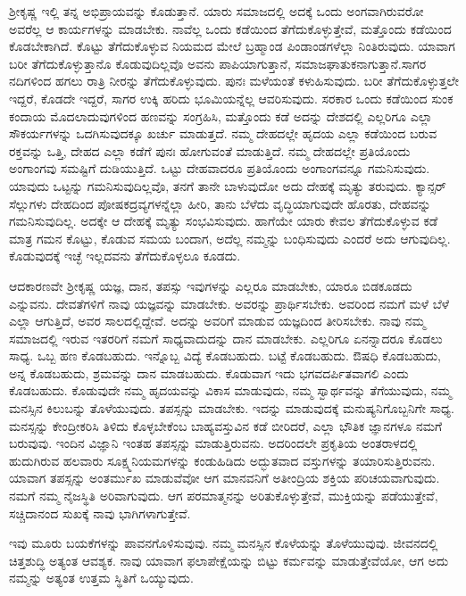 ಶ‍್ರೀಕೃಷ್ಣ ಇಲ್ಲಿ ತನ್ನ ಅಭಿಪ್ರಾಯವನ್ನು ಕೊಡುತ್ತಾನೆ. ಯಾರು ಸಮಾಜದಲ್ಲಿ ಅದಕ್ಕೆ ಒಂದು ಅಂಗವಾಗಿರುವರೋ ಅವರೆಲ್ಲ ಆ ಕಾರ್ಯಗಳನ್ನು ಮಾಡಬೇಕು. ನಾವೆಲ್ಲ ಒಂದು ಕಡೆಯಿಂದ ತೆಗೆದುಕೊಳ್ಳುತ್ತೇವೆ, ಮತ್ತೊಂದು ಕಡೆಯಿಂದ ಕೊಡಬೇಕಾಗಿದೆ. ಕೊಟ್ಟು ತೆಗೆದುಕೊಳ್ಳುವ ನಿಯಮದ ಮೇಲೆ ಬ್ರಹ್ಮಾಂಡ ಪಿಂಡಾಂಡಗಳೆಲ್ಲಾ ನಿಂತಿರುವುದು. ಯಾವಾಗ ಬರೀ ತೆಗೆದು\-ಕೊಳ್ಳುತ್ತಾನೊ ಕೊಡುವುದಿಲ್ಲವೊ ಅವನು ಪಾಪಿಯಾಗುತ್ತಾನೆ, ಸಮಾಜಘಾತುಕನಾಗುತ್ತಾನೆ.\break ಸಾಗರ ನದಿಗಳಿಂದ ಹಗಲು ರಾತ್ರಿ ನೀರನ್ನು ತೆಗೆದುಕೊಳ್ಳುವುದು. ಪುನಃ ಮಳೆಯಂತೆ ಕಳುಹಿಸುವುದು. ಬರೀ ತೆಗೆದುಕೊಳ್ಳುತ್ತಲೇ ಇದ್ದರೆ, ಕೊಡದೇ ಇದ್ದರೆ, ಸಾಗರ ಉಕ್ಕಿ ಹರಿದು ಭೂಮಿಯನ್ನೆಲ್ಲ ಆವರಿಸುವುದು. ಸರಕಾರ ಒಂದು ಕಡೆಯಿಂದ ಸುಂಕ ಕಂದಾಯ ಮೊದಲಾದುವುಗಳಿಂದ ಹಣವನ್ನು ಸಂಗ್ರಹಿಸಿ, ಮತ್ತೊಂದು ಕಡೆ ಅದನ್ನು ದೇಶದಲ್ಲಿ ಎಲ್ಲರಿಗೂ ಎಲ್ಲಾ ಸೌಕರ್ಯಗಳನ್ನು ಒದಗಿಸುವುದಕ್ಕೂ ಖರ್ಚು ಮಾಡುತ್ತದೆ. ನಮ್ಮ ದೇಹದಲ್ಲೇ ಹೃದಯ ಎಲ್ಲಾ ಕಡೆಯಿಂದ ಬರುವ ರಕ್ತವನ್ನು ಒತ್ತಿ, ದೇಹದ ಎಲ್ಲಾ ಕಡೆಗೆ ಪುನಃ ಹೋಗುವಂತೆ ಮಾಡುತ್ತಿದೆ. ನಮ್ಮ ದೇಹದಲ್ಲೇ ಪ್ರತಿಯೊಂದು ಅಂಗಾಂಗವು ಸಮಷ್ಟಿಗೆ ದುಡಿಯುತ್ತಿದೆ. ಒಟ್ಟು ದೇಹವಾದರೂ ಪ್ರತಿಯೊಂದು ಅಂಗಾಂಗವನ್ನೂ ಗಮನಿಸುವುದು. ಯಾವುದು ಒಟ್ಟನ್ನು ಗಮನಿಸುವುದಿಲ್ಲವೊ, ತನಗೆ ತಾನೇ ಬಾಳುವುದೋ ಅದು ದೇಹಕ್ಕೆ ಮೃತ್ಯು ತರುವುದು. ಕ್ಯಾನ್ಸರ್ ಸೆಲ್ಲುಗಳು ದೇಹದಿಂದ ಪೋಷಕದ್ರವ್ಯಗಳನ್ನೆಲ್ಲಾ ಹೀರಿ, ತಾನು ಬೆಳೆದು ವೃದ್ಧಿಯಾಗುವುದೇ ಹೊರತು, ದೇಹವನ್ನು ಗಮನಿಸುವುದಿಲ್ಲ. ಅದಕ್ಕೇ ಆ ದೇಹಕ್ಕೆ ಮೃತ್ಯು ಸಂಭವಿಸುವುದು. ಹಾಗೆಯೇ ಯಾರು ಕೇವಲ ತೆಗೆದುಕೊಳ್ಳುವ ಕಡೆ ಮಾತ್ರ ಗಮನ ಕೊಟ್ಟು, ಕೊಡುವ ಸಮಯ ಬಂದಾಗ, ಅದೆಲ್ಲ ನಮ್ಮನ್ನು ಬಂಧಿಸುವುದು ಎಂದರೆ ಅದು ಆಗುವುದಿಲ್ಲ. ಕೊಡುವುದಕ್ಕೆ ಇಚ್ಛೆ ಇಲ್ಲದವನು ತೆಗೆದುಕೊಳ್ಳಲೂ ಕೂಡದು.

ಆದಕಾರಣವೇ ಶ‍್ರೀಕೃಷ್ಣ ಯಜ್ಞ, ದಾನ, ತಪಸ್ಸು ಇವುಗಳನ್ನು ಎಲ್ಲರೂ ಮಾಡಬೇಕು, ಯಾರೂ ಬಿಡಕೂಡದು ಎನ್ನುವನು. ದೇವತೆಗಳಿಗೆ ನಾವು ಯಜ್ಞವನ್ನು ಮಾಡಬೇಕು. ಅವರನ್ನು ಪ್ರಾರ್ಥಿಸಬೇಕು. ಅವರಿಂದ ನಮಗೆ ಮಳೆ ಬೆಳೆ ಎಲ್ಲಾ ಆಗುತ್ತಿದೆ, ಅವರ ಸಾಲದಲ್ಲಿದ್ದೇವೆ. ಅದನ್ನು ಅವರಿಗೆ ಮಾಡುವ ಯಜ್ಞದಿಂದ ತೀರಿಸಬೇಕು. ನಾವು ನಮ್ಮ ಸಮಾಜದಲ್ಲಿ ಇರುವ ಇತರರಿಗೆ ನಮಗೆ ಸಾಧ್ಯವಾದುದನ್ನು ದಾನ ಮಾಡಬೇಕು. ಎಲ್ಲರಿಗೂ ಏನನ್ನಾದರೂ ಕೊಡಲು ಸಾಧ್ಯ. ಒಬ್ಬ ಹಣ ಕೊಡಬಹುದು. ಇನ್ನೊಬ್ಬ ವಿದ್ಯೆ ಕೊಡಬಹುದು. ಬಟ್ಟೆ ಕೊಡಬಹುದು. ಔಷಧಿ ಕೊಡಬಹುದು, ಅನ್ನ ಕೊಡಬಹುದು, ಶ್ರಮವನ್ನು ದಾನ ಮಾಡಬಹುದು. ಕೊಡುವಾಗ ಇದು ಭಗವದರ್ಪಿತವಾಗಲಿ ಎಂದು ಕೊಡಬಹುದು. ಕೊಡುವುದೇ ನಮ್ಮ ಹೃದಯವನ್ನು ವಿಕಾಸ ಮಾಡುವುದು, ನಮ್ಮ ಸ್ವಾರ್ಥವನ್ನು ತೆಗೆಯುವುದು, ನಮ್ಮ ಮನಸ್ಸಿನ ಕಿಲುಬನ್ನು ತೊಳೆಯುವುದು. ತಪಸ್ಸನ್ನು ಮಾಡಬೇಕು. ಇದನ್ನು ಮಾಡುವುದಕ್ಕೆ ಮನುಷ್ಯನಿಗೊಬ್ಬನಿಗೇ ಸಾಧ್ಯ. ಮನಸ್ಸನ್ನು ಕೇಂದ್ರೀಕರಿಸಿ ತಿಳಿದು ಕೊಳ್ಳಬೇಕೆಂಬ ಬಾಹ್ಯವಸ್ತುವಿನ ಕಡೆ ಬೀರಿದರೆ, ಎಲ್ಲಾ ಭೌತಿಕ ಜ್ಞಾನಗಳೂ ನಮಗೆ ಬರುವುವು. ಇಂದಿನ ವಿಜ್ಞಾನಿ ಇಂತಹ ತಪಸ್ಸನ್ನು ಮಾಡುತ್ತಿರುವನು. ಅದರಿಂದಲೇ ಪ್ರಕೃತಿಯ ಅಂತರಾಳದಲ್ಲಿ ಹುದುಗಿರುವ ಹಲವಾರು ಸೂಕ್ಷ್ಮನಿಯಮಗಳನ್ನು ಕಂಡುಹಿಡಿದು ಅದ್ಭುತವಾದ ವಸ್ತುಗಳನ್ನು ತಯಾರಿಸುತ್ತಿರುವನು. ಯಾವಾಗ ತಪಸ್ಸನ್ನು ಅಂತ\-ರ್ಮುಖ ಮಾಡುವೆವೋ ಆಗ ಮಾನವನಿಗೆ ಅತೀಂದ್ರಿಯ ಶಕ್ತಿಯ ಪರಿಚಯವಾಗುವುದು. ನಮಗೆ ನಮ್ಮ ನೈಜಸ್ಥಿತಿ ಅರಿವಾಗುವುದು. ಆಗ ಪರಮಾತ್ಮನನ್ನು ಅರಿತುಕೊಳ್ಳುತ್ತೇವೆ, ಮುಕ್ತಿಯನ್ನು ಪಡೆಯುತ್ತೇವೆ, ಸಚ್ಚಿದಾನಂದ ಸುಖಕ್ಕೆ ನಾವು ಭಾಗಿಗಳಾಗುತ್ತೇವೆ.

ಇವು ಮೂರು ಬಯಕೆಗಳನ್ನು ಪಾವನಗೊಳಿಸುವುವು. ನಮ್ಮ ಮನಸ್ಸಿನ ಕೊಳೆಯನ್ನು ತೊಳೆಯುವುವು. ಜೀವನದಲ್ಲಿ ಚಿತ್ತಶುದ್ಧಿ ಅತ್ಯಂತ ಆವಶ್ಯಕ. ನಾವು ಯಾವಾಗ ಫಲಾಪೇಕ್ಷೆಯನ್ನು ಬಿಟ್ಟು ಕರ್ಮವನ್ನು ಮಾಡುತ್ತೇವೆಯೋ, ಆಗ ಅದು ನಮ್ಮನ್ನು ಅತ್ಯಂತ ಉತ್ತಮ ಸ್ಥಿತಿಗೆ ಒಯ್ಯುವುದು.

